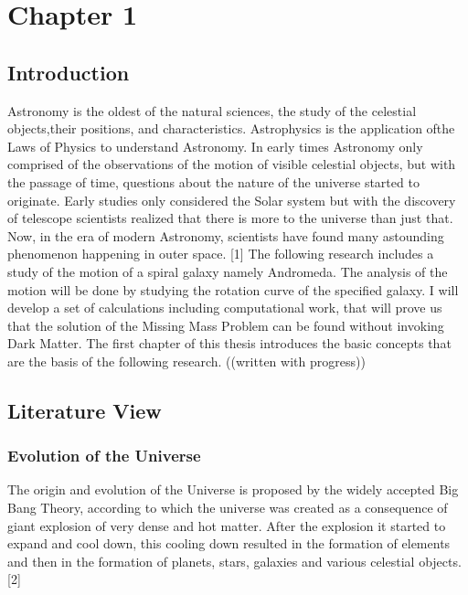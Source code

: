 \documentclass{article}
\begin{document}
\section{Chapter 1}
\subsection{Introduction}
Astronomy is the oldest of the natural sciences, the study of the celestial objects,their positions, and characteristics. Astrophysics is the application ofthe Laws of Physics to understand Astronomy. In early times Astronomy only comprised of the observations of the motion of visible celestial objects, but with the passage of time, questions about the nature of the universe started to originate. Early studies only considered the Solar system but with the discovery of telescope scientists realized that there is more to the universe than just that. Now, in the era of modern Astronomy, scientists have found many astounding phenomenon happening in outer space. [1]
The following research includes a study of the motion of a spiral galaxy namely Andromeda. The analysis of the motion will be done by studying the rotation curve of the specified galaxy. I will develop a set of calculations including computational work, that will prove us that the solution of the Missing Mass Problem can be found without invoking Dark Matter. 
The first chapter of this thesis introduces the basic concepts that are the basis of the following research.
((written with progress)) 
\subsection{Literature View}
\subsubsection{Evolution of the Universe}
 The origin and evolution of the Universe is proposed by the widely accepted Big Bang Theory, according to which the universe was created as a consequence of giant explosion of very dense and hot matter. After the explosion it started to expand and cool down, this cooling down resulted in the formation of elements and then in the formation of planets, stars, galaxies and various celestial objects. [2]
 
\end{document}
